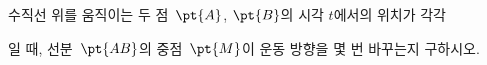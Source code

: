 수직선 위를 움직이는 두 점~$\pt{A}$, $\pt{B}$의 시각 $t$에서의 위치가 각각\par\smallskip{}\par\smallskip\noindent 일 때, 선분~$\pt{AB}$의 중점~$\pt{M}$이 운동 방향을 몇 번 바꾸는지 구하시오.
